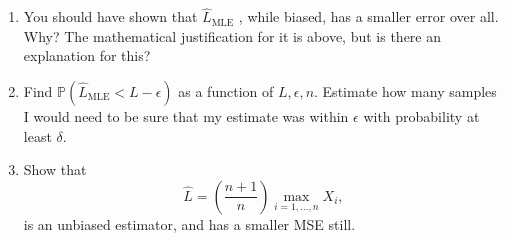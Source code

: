 \documentclass[letter, 12pt]{article}
\begin{document}
\begin{enumerate}[wide = 0pt, label = \arabic*)]
		\item {You should have shown that $ \hat{L}_{\text{MLE}} $ , while biased, has a smaller error over all. Why? The mathematical justification for it is above, but is there an explanation for this?}
		
		\item {Find $ \mathbb{P}(\hat{L}_{\text{MLE}} < L - \epsilon) $ as a function of $ L, \epsilon, n $. Estimate how many samples I would need to be sure that my estimate was within $ \epsilon $ with probability at least $ \delta $.}
		
		\item {Show that
		\begin{equation}
			\hat{L} = (\frac{n+1}{n})\max_{i=1,\dots,n}X_i,
		\end{equation}
		is an unbiased estimator, and has a smaller MSE still.
		}
	\end{enumerate}
\end{document}
